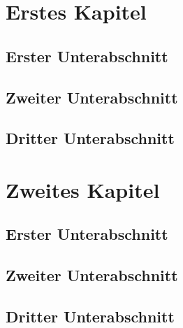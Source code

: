 \documentclass[
   paper = a5,
   BCOR = 1mm,
   DIV = 14,
   headinclude,
   fontsize = 10pt,
]{scrbook}
\begin{document}
\chapter{Erstes Kapitel}
\section{Erster Unterabschnitt}
\lipsum
\section{Zweiter Unterabschnitt}
\lipsum
\lipsum
\section{Dritter Unterabschnitt}
\lipsum
\chapter{Zweites Kapitel}
\section{Erster Unterabschnitt}
\lipsum
\section{Zweiter Unterabschnitt}
\lipsum
\lipsum
\section{Dritter Unterabschnitt}
\lipsum
\end{document}
